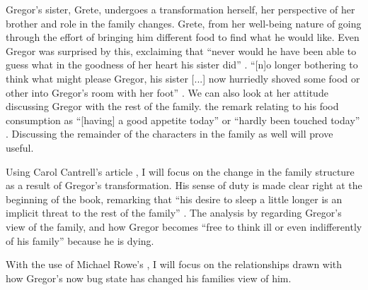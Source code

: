 \documentclass{article}
\begin{document}
Gregor's sister, Grete, undergoes a transformation herself, her perspective
of her brother and role in the family changes. Grete, from her well-being
nature of going through the effort of bringing him different food to find
what he would like. Even Gregor was surprised by this, exclaiming that
``never would he have been able to guess what in the goodness of her heart
his sister did'' \cite[109]{kafka2007meta}.
 ``[n]o longer bothering to think what might please Gregor, his sister [...]
now hurriedly shoved some food or other into Gregor's room with her foot''
\cite[130]{kafka2007meta}. We can also look at her attitude discussing
Gregor with the rest of the family.
the remark relating to
his food consumption as ``[having] a good appetite today'' or ``hardly been
touched today'' \cite[111, 111]{kafka2007meta}. Discussing the remainder of
the characters in the family as well will prove useful.

Using Carol Cantrell's article , I will focus on
the change in the family structure as a result of Gregor's transformation.
His sense of duty is made clear right at the beginning of the book,
\citeauthor{cantrellFamily} remarking that ``his desire to sleep a little
longer is an implicit threat to the rest of the family''
\cite[581]{cantrellFamily}. The analysis by \citeauthor{cantrellFamily}
regarding Gregor's view of the family, and how Gregor becomes ``free to
think ill or even indifferently of his family'' \cite[585]{cantrellFamily}
because he is dying.

With the use of Michael Rowe's , I will focus on the
relationships drawn with how Gregor's now bug state has changed his families
view of him.

\makeworkscited
\end{document}
